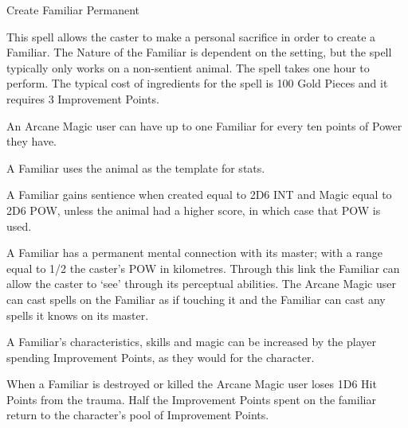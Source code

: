 \begin{rpg-spell}
{Create Familiar}
{Permanent}

This spell allows the caster to make a personal sacrifice in order to create a Familiar. The Nature of the Familiar is dependent on the setting, but the spell typically only works on a non-sentient animal. The spell takes one hour to perform. The typical cost of ingredients for the spell is 100 Gold Pieces and it requires 3 Improvement Points. 

\begin{rpg-list}
\item An Arcane Magic user can have up to one Familiar for every ten points of Power they have.
\item A Familiar uses the animal as the template for stats.
\item A Familiar gains sentience when created equal to 2D6 INT and Magic equal to 2D6 POW, unless the animal had a higher score, in which case that POW is used. 
\item A Familiar has a permanent mental connection with its master; with a range equal to 1/2 the caster’s POW in kilometres. Through this link the Familiar can allow the caster to ‘see’ through its perceptual abilities. The Arcane Magic user can cast spells on the Familiar as if touching it and the Familiar can cast any spells it knows on its master.
\item A Familiar's characteristics, skills and magic can be increased by the player spending Improvement Points, as they would for the character.
\item When a Familiar is destroyed or killed the Arcane Magic user loses 1D6 Hit Points from the trauma. Half the Improvement Points spent on the familiar return to the character's pool of Improvement Points.
\end{rpg-list}

\end{rpg-spell}


